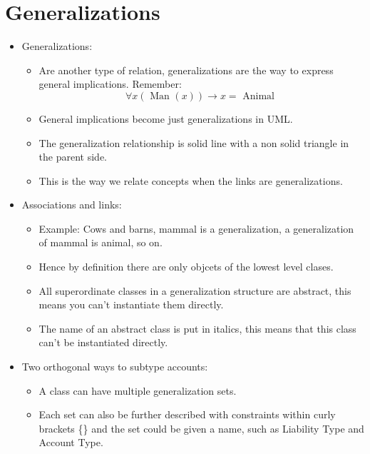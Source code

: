 \section{Generalizations}
\begin{itemize}
    \item Generalizations:
        \begin{itemize}
            \item Are another type of relation, generalizations are the way to express general implications. Remember:
                \[
                  \forall x  (\text{ Man }(x)) \rightarrow x = \text{ Animal }
                \]
            
            \item General implications become just generalizations in UML.
            \item The generalization relationship is solid line with a non solid triangle in the parent side.
            \item This is the way we relate concepts when the links are generalizations.
        \end{itemize}
    
    \item Associations and links:
        \begin{itemize}
            \item Example: Cows and barns, mammal is a generalization, a generalization of mammal is animal, so on. 
            \item Hence by definition there are only objcets of the lowest level clases.
            \item All superordinate classes in a generalization structure are abstract, this means you can't instantiate them directly. 
            \item The name of an abstract class is put in italics, this means that this class can't be instantiated directly. 
        \end{itemize}
    
    \item Two orthogonal ways to subtype accounts: 
        \begin{itemize}
            \item A class can have multiple generalization sets. 
            \item Each set can also be further described with constraints within curly brackets \{\} and the set could be given a name, such as Liability Type and Account Type.
        \end{itemize}
    

\end{itemize}
